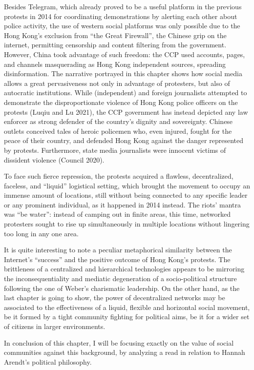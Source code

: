\documentclass[
  a4paper,
]{book}
\begin{document}
Besides Telegram, which already proved to be a useful platform in the previous protests in 2014 for coordinating demonstrations by alerting each other about police activity, the use of western social platforms was only possible due to the Hong Kong's exclusion from ``the Great Firewall'', the Chinese grip on the internet, permitting censorship and content filtering from the government. However, China took advantage of such freedom: the CCP used accounts, pages, and channels masquerading as Hong Kong independent sources, spreading disinformation. The narrative portrayed in this chapter shows how social media allows a great pervasiveness not only in advantage of protesters, but also of autocratic institutions. While (independent) and foreign journalists attempted to demonstrate the disproportionate violence of Hong Kong police officers on the protests {(Luqiu and Lu 2021)}, the CCP government has instead depicted any law enforcer as strong defender of the country's dignity and sovereignty. Chinese outlets conceived tales of heroic policemen who, even injured, fought for the peace of their country, and defended Hong Kong against the danger represented by protests. Furthermore, state media journalists were innocent victims of dissident violence {(Council 2020)}.

To face such fierce repression, the protests acquired a flawless, decentralized, faceless, and ``liquid'' logistical setting, which brought the movement to occupy an immense amount of locations, still without being connected to any specific leader or any prominent individual, as it happened in 2014 instead. The riots' mantra was ``be water'': instead of camping out in finite areas, this time, networked protesters sought to rise up simultaneously in multiple locations without lingering too long in any one area.

It is quite interesting to note a peculiar metaphorical similarity between the Internet's ``success'' and the positive outcome of Hong Kong's protests. The brittleness of a centralized and hierarchical technologies appears to be mirroring the inconsequentiality and mediatic degeneration of a socio-political structure following the one of Weber's charismatic leadership. On the other hand, as the last chapter is going to show, the power of decentralized networks may be associated to the effectiveness of a liquid, flexible and horizontal social movement, be it formed by a tight community fighting for political aims, be it for a wider set of citizens in larger environments.

In conclusion of this chapter, I will be focusing exactly on the value of social communities against this background, by analyzing a read in relation to Hannah Arendt's political philosophy.
\end{document}
